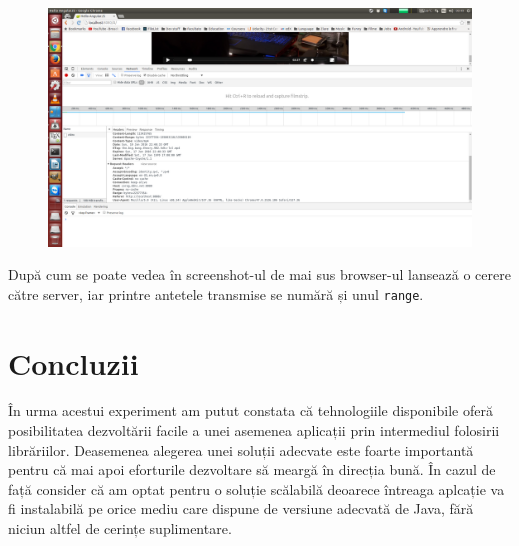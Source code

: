 \documentclass[12pt, a4paper, oneside, romanian]{teza-upb}
\begin{document}
\begin{figure}[h]
\centering
\includegraphics*[scale=0.2]{img/poza4.png}
\end{figure}

După cum se poate vedea în screenshot-ul de mai sus browser-ul lansează o cerere către server, iar printre antetele transmise se numără și unul \texttt{range}.
\newpage
\chapter{Concluzii}
În urma acestui experiment am putut constata că tehnologiile disponibile oferă posibilitatea dezvoltării facile a unei asemenea aplicații prin intermediul folosirii librăriilor. Deasemenea alegerea unei soluții adecvate este foarte importantă pentru că mai apoi eforturile dezvoltare să meargă în direcția bună. În cazul de față consider că am optat pentru o soluție scălabilă deoarece întreaga aplcație va fi instalabilă pe orice mediu care dispune de versiune adecvată de Java, fără niciun altfel de cerințe suplimentare.
\end{document}
